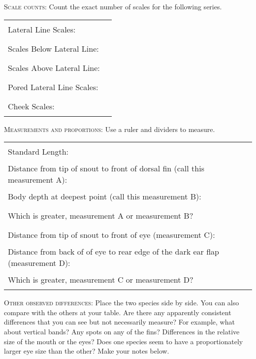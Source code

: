\documentclass[12pt, hidelinks]{exam}
\begin{document}

\newpage

\textsc{Scale counts:} Count the exact number of scales for the following series.

\bigskip

\begin{tabular}{ll}

Lateral Line Scales: & \rule{3cm}{0.4pt} \\[1.5em]

Scales Below Lateral Line: & \rule{3cm}{0.4pt} \\[1.5em]

Scales Above Lateral Line: & \rule{3cm}{0.4pt} \\[1.5em]

Pored Lateral Line Scales: & \rule{3cm}{0.4pt} \\[1.5em]

Cheek Scales: & \rule{3cm}{0.4pt} \\

\end{tabular}

\bigskip

\textsc{Measurements and proportions:} Use a ruler and dividers to measure.

\bigskip

\begin{tabular}{L{7cm}l}

Standard Length:	& 
\rule{3cm}{0.4pt} \\[1.5em]

Distance from tip of snout to front of dorsal fin (call this measurement A):		& 
\rule{3cm}{0.4pt} \\[1.5em]

Body depth at deepest point (call this measurement B): & \rule{3cm}{0.4pt} \\[1.5em]

Which is greater, measurement A or 
measurement B? & \rule{3cm}{0.4pt} \\[1.5em]

Distance from tip of snout to front of eye (measurement C): & \rule{3cm}{0.4pt} \\[1.5em]

Distance from back of of eye to rear edge of the dark ear flap (measurement D): & \rule{3cm}{0.4pt} \\[1.5em]

Which is greater, measurement C or measurement D? & \rule{3cm}{0.4pt} \\

\end{tabular}

\bigskip

\textsc{Other observed differences:} Place the two species side by side. You can also compare with the others at your table. Are there any apparently consistent differences that you can see but not necessarily measure?  For example, what about vertical bands? Any spots on any of the fins?  Differences in the relative size of the mouth or the eyes? Does one species seem to have a proportionately larger eye size than the other?  Make your notes below.
\end{document}
